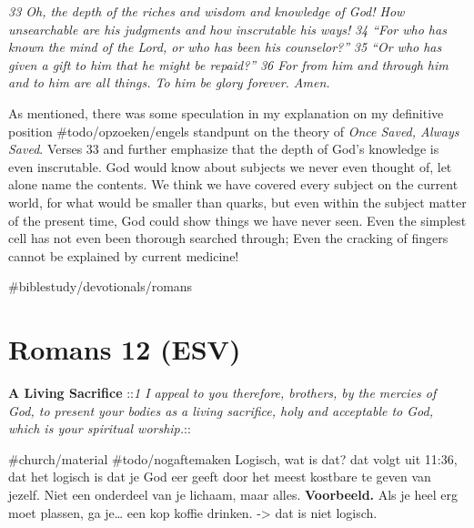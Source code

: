 \emph{33 Oh, the depth of the riches and wisdom and knowledge of God!
How unsearchable are his judgments and how inscrutable his ways!}
\emph{34 ``For who has known the mind of the Lord,\emph{ }or who has
been his counselor?''} \emph{35 ``Or who has given a gift to him\emph{
}that he might be repaid?''} \emph{36 For from him and through him and
to him are all things. To him be glory forever. Amen.}

As mentioned, there was some speculation in my explanation on my
definitive position \#todo/opzoeken/engels standpunt on the theory of
\emph{Once Saved, Always Saved}. Verses 33 and further emphasize that
the depth of God's knowledge is even inscrutable. God would know about
subjects we never even thought of, let alone name the contents. We think
we have covered every subject on the current world, for what would be
smaller than quarks, but even within the subject matter of the present
time, God could show things we have never seen. Even the simplest cell
has not even been thorough searched through; Even the cracking of
fingers cannot be explained by current medicine!

\#biblestudy/devotionals/romans

\hypertarget{romans-12-esv}{%
\section{Romans 12 (ESV)}\label{romans-12-esv}}

\textbf{A Living Sacrifice} ::\emph{1 I appeal to you therefore,
brothers, by the mercies of God, to present your bodies as a living
sacrifice, holy and acceptable to God, which is your spiritual
worship.}::

\#church/material \#todo/nogaftemaken Logisch, wat is dat? dat volgt uit
11:36, dat het logisch is dat je God eer geeft door het meest kostbare
te geven van jezelf. Niet een onderdeel van je lichaam, maar alles.
\textbf{Voorbeeld.} Als je heel erg moet plassen, ga je\ldots{} een kop
koffie drinken. -\textgreater{} dat is niet logisch.

